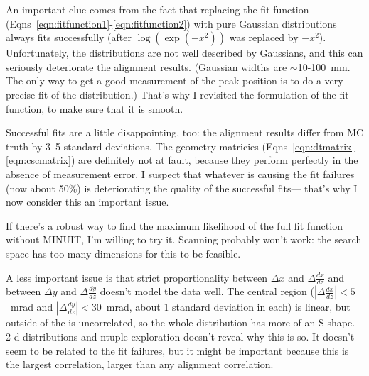 \documentclass[12pt]{article}
\begin{document}
An important clue comes from the fact that replacing the fit function
(Eqns~\ref{eqn:fitfunction1}-\ref{eqn:fitfunction2}) with pure
Gaussian distributions always fits successfully (after
$\log(\exp(-x^2))$ was replaced by $-x^2$).  Unfortunately, the
distributions are not well described by Gaussians, and this can
seriously deteriorate the alignment results.  (Gaussian widths are
$\sim$10-100~mm.  The only way to get a good measurement of the peak
position is to do a very precise fit of the distribution.)  That's why
I revisited the formulation of the fit function, to make sure that it
is smooth.

Successful fits are a little disappointing, too: the alignment results
differ from MC truth by 3--5 standard deviations.  The geometry
matricies (Eqns~\ref{eqn:dtmatrix}--\ref{eqn:cscmatrix}) are
definitely not at fault, because they perform perfectly in the absence
of measurement error.  I suspect that whatever is causing the fit
failures (now about 50\%) is deteriorating the quality of the
successful fits--- that's why I now consider this an important issue.

If there's a robust way to find the maximum likelihood of the full fit
function without MINUIT, I'm willing to try it.  Scanning probably
won't work: the search space has too many dimensions for this to be
feasible.

A less important issue is that strict proportionality between $\Delta
x$ and $\Delta \frac{dx}{dz}$ and between $\Delta y$ and $\Delta
\frac{dy}{dz}$ doesn't model the data well.  The central region
($|\Delta \frac{dx}{dz}| < 5$~mrad and $|\Delta \frac{dy}{dz}| <
30$~mrad, about 1 standard deviation in each) is linear, but outside
of the is uncorrelated, so the whole distribution has more of an
S-shape.  2-d distributions and ntuple exploration doesn't reveal why
this is so.  It doesn't seem to be related to the fit failures, but it
might be important because this is the largest correlation, larger
than any alignment correlation.
\end{document}
